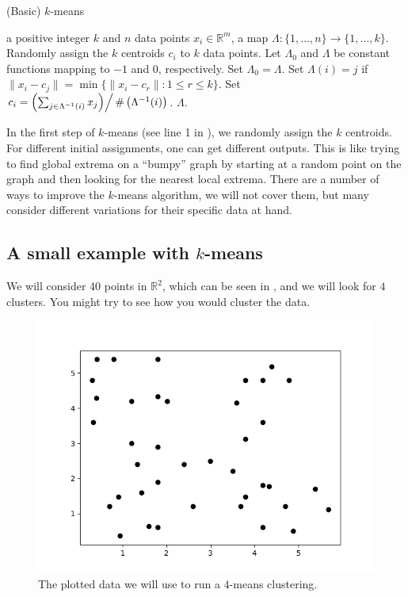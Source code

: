 \documentclass[a4paper, 12pt]{article}
\numberwithin{equation}{section}
\numberwithin{figure}{section}
\theoremstyle{definition}
\renewcommand{\leq}{\leqslant}
\newcommand{\R}{\mathbb{R}}
\begin{document}
\begin{algorithm}
	\caption{(Basic) $k$-means}\label{alg:k-means}
	\begin{algorithmic}[1]
		\Require a positive integer $k$ and $n$ data points $x_i\in\R^m$,
		\Ensure a map $\Lambda : \{1,\dots,n\} \to \{1,\dots, k\}$.
		\State Randomly assign the $k$ centroids $c_i$ to $k$ data points.
		\State Let $\Lambda_0$ and $\Lambda$ be constant functions mapping to $-1$ and $0$, respectively.
		\While{$\Lambda_0 \neq \Lambda$}
			\State Set $\Lambda_0 = \Lambda$.
				\State Set $\Lambda(i) = j$ if $\|x_i-c_j\| = \min\{\|x_i-c_r\| : 1\leq r \leq k\}$.
			\EndFor
				\State Set $c_i = \left(\sum_{j \in \Lambda^{-1}(i)} x_j\middle) \right/ \# \left(\Lambda^{-1}(i)\right)$.
			\EndFor
		\EndWhile
		\State \Return $\Lambda$.
	\end{algorithmic}
\end{algorithm}

In the first step of $k$-means (see line 1 in ), we randomly
assign the $k$ centroids. For different initial assignments, one can get
different outputs. This is like trying to find global extrema on a ``bumpy''
graph by starting at a random point on the graph and then looking for the
nearest local extrema. There are a number of ways to improve the $k$-means
algorithm, we will not cover them, but many consider different variations for
their specific data at hand. 

\subsection{A small example with $k$-means}

We will consider 40 points in $\R^2$, which can be seen in ,
and we will look for $4$ clusters. You might try to see how you would cluster
the data. 

\begin{figure}[h]
	\centering 
	\includegraphics[scale=0.6]{graphics/k_means_iter-1.png}
	\caption{The plotted data we will use to run a $4$-means clustering.}
	\label{fig:4-means}
\end{figure}
\end{document}
